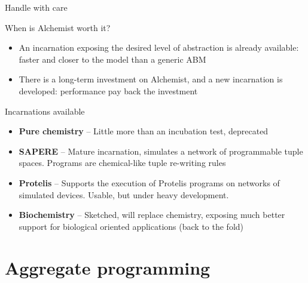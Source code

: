 \documentclass[presentation]{beamer}\mode<presentation>{\usetheme{sapere}}
\begin{document}
\begin{frame}{Handle with care}
\begin{block}{When is Alchemist worth it?}
\begin{itemize}
 \item An incarnation exposing the desired level of abstraction is already available: faster and closer to the model than a generic ABM
 \item There is a long-term investment on Alchemist, and a new incarnation is developed: performance pay back the investment
\end{itemize}
\end{block}
\begin{block}{Incarnations available}
\begin{itemize}
 \item \textbf{Pure chemistry} -- Little more than an incubation test, deprecated
 \item \textbf{SAPERE} -- Mature incarnation, simulates a network of programmable tuple spaces. Programs are chemical-like tuple re-writing rules 
 \item \textbf{Protelis} -- Supports the execution of Protelis programs on networks of simulated devices. Usable, but under heavy development.
 \item \textbf{Biochemistry} -- Sketched, will replace chemistry, exposing much better support for biological oriented applications (back to the fold)
\end{itemize}
\end{block}
\end{frame}

\section{Aggregate programming}
\end{document}
